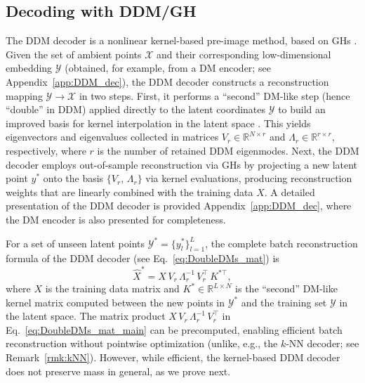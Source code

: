 \documentclass{article}
\begin{document}
\subsection{Decoding with DDM/GH}\label{sec:decodingwithDMS}
The DDM decoder is a nonlinear kernel-based pre-image method, based on GHs  \cite{evangelou2022double,coifman2006geometric}. Given the set of ambient points $\mathcal{X}$ and their corresponding low-dimensional embedding $\mathcal{Y}$ (obtained, for example, from a DM encoder; see Appendix~\ref{app:DDM_dec}), the DDM decoder constructs a reconstruction mapping $\mathcal{Y}\to\mathcal{X}$ in two steps. First, it performs a ``second'' DM-like step (hence ``double'' in DDM) applied directly to the latent coordinates $\mathcal{Y}$ to build an improved basis for kernel interpolation in the latent space \cite{evangelou2022double,Patsatzis_2023}. This yields eigenvectors and eigenvalues collected in matrices $V_r\in\mathbb{R}^{N\times r}$ and $\Lambda_r \in \mathbb{R}^{r\times r}$, respectively, where $r$ is the number of retained DDM eigenmodes. Next, the DDM decoder employs out-of-sample reconstruction via GHs \cite{coifman2005geometric,coifman2006geometric} by projecting a new latent point $y^*$ onto the basis $\{V_r,\, \Lambda_r\}$ via kernel evaluations, producing reconstruction weights that are linearly combined with the training data $X$. A detailed presentation of the DDM decoder is provided Appendix~\ref{app:DDM_dec}, where the DM encoder is also presented for completeness. 

For a set of unseen latent points $\mathcal{Y}^*=\{ y^*_l\}_{l=1}^L$, the complete batch reconstruction formula of the DDM decoder (see Eq.~\eqref{eq:DoubleDMs_mat}) is
\begin{equation}
\widehat{X}^* = X\,V_r\, \Lambda_r^{-1} \, V_r^\top \, K^{*\top},
    \label{eq:DoubleDMs_mat_main}
\end{equation}
where $X$ is the training data matrix and $K^*\in \mathbb{R}^{L \times N}$ is the ``second'' DM-like kernel matrix computed between the new points in $\mathcal{Y}^*$ and the training set $\mathcal{Y}$ in the latent space. %
The matrix product $X\,V_r\, \Lambda_r^{-1} \, V_r^\top$ in Eq.~\eqref{eq:DoubleDMs_mat_main} can be precomputed, enabling efficient batch reconstruction without pointwise optimization (unlike, e.g., the $k$-NN decoder; see Remark~\ref{rmk:kNN}). However, while efficient, the kernel-based DDM decoder does not preserve mass in general, as we prove next. 
\end{document}
